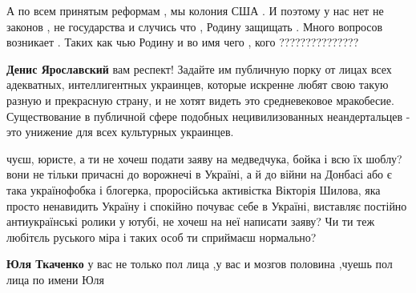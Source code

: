 \begin{itemize}
\begin{itemize}
А по всем принятым реформам , мы колония США . И поэтому у нас нет не законов ,
не государства и случись что , Родину защищать . Много вопросов возникает .
Таких как чью Родину и во имя чего , кого ???????????????

\end{itemize}

 

\textbf{Денис Ярославский} вам респект! Задайте им публичную порку от лицах
всех адекватных, интеллигентных украинцев, которые искренне любят свою такую
разную и прекрасную страну, и не хотят видеть это средневековое мракобесие.
Существование в публичной сфере подобных нецивилизованных неандертальцев - это
унижение для всех культурных украинцев.

 

чуєш, юристе, а ти не хочеш подати заяву на медведчука, бойка і всю їх шоблу?
вони не тільки причасні до ворожнечі в Україні, а й до війни на Донбасі або є
така українофобка і блогерка, проросійська активістка Вікторія Шилова, яка
просто ненавидить Україну і спокійно почуває себе в Україні, виставляє постійно
антиукраїнські ролики у ютубі, не хочеш на неї написати заяву? Чи ти теж
любітєль руського міра і таких особ ти сприймаєш нормально?

\begin{itemize}
 
\textbf{Юля Ткаченко} у вас не только пол лица ,у вас и мозгов половина ,чуешь пол лица по имени Юля

 

\end{itemize}
\end{itemize}
